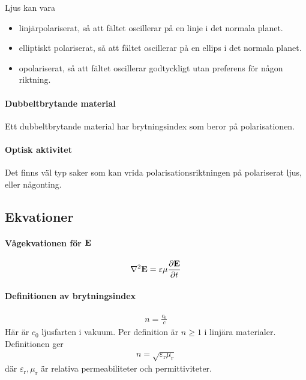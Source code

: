 Ljus kan vara
\begin{itemize}
	\item linjärpolariserat, så att fältet oscillerar på en linje i det normala planet.
	\item elliptiskt polariserat, så att fältet oscillerar på en ellips i det normala planet.
	\item opolariserat, så att fältet oscillerar godtyckligt utan preferens för någon riktning.
\end{itemize}

\paragraph{Dubbeltbrytande material}
Ett dubbeltbrytande material har brytningsindex som beror på polarisationen.

\paragraph{Optisk aktivitet}
Det finns väl typ saker som kan vrida polarisationsriktningen på polariserat ljus, eller någonting.

\subsection{Ekvationer}

\paragraph{Vågekvationen för $\vect{E}$}
\begin{align*}
	\laplacian{\vect{E}} = \varepsilon\mu\pdv{\vect{E}}{t}
\end{align*}

\deriv

\paragraph{Definitionen av brytningsindex}
\begin{align*}
	n = \frac{c_0}{c}
\end{align*}
Här är $c_0$ ljusfarten i vakuum. Per definition är $n\geq 1$ i linjära materialer. Definitionen ger
\begin{align*}
	n = \sqrt{\varepsilon_{\text{r}}\mu_{\text{r}}}
\end{align*}
där $\varepsilon_{\text{r}}, \mu_{\text{r}}$ är relativa permeabiliteter och permittiviteter.

